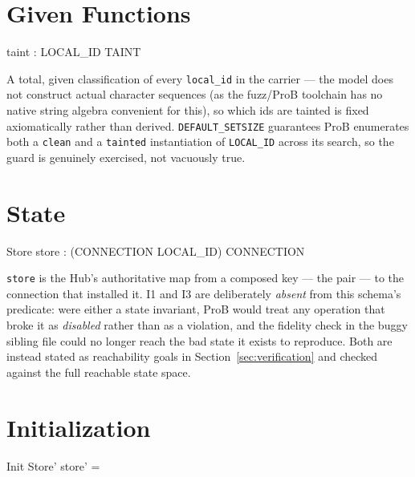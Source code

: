 \documentclass[a4paper,10pt,fleqn]{article}
\begin{document}
\section{Given Functions}

\begin{axdef}
  taint : LOCAL\_ID \fun TAINT
\end{axdef}

A total, given classification of every \texttt{local\_id} in the carrier ---
the model does not construct actual character sequences (as the fuzz/ProB
toolchain has no native string algebra convenient for this), so which ids are
tainted is fixed axiomatically rather than derived. \texttt{DEFAULT\_SETSIZE}
guarantees ProB enumerates both a \texttt{clean} and a \texttt{tainted}
instantiation of \texttt{LOCAL\_ID} across its search, so the guard is
genuinely exercised, not vacuously true.

\section{State}

\begin{schema}{Store}
  store : (CONNECTION \cross LOCAL\_ID) \pfun CONNECTION
\end{schema}

\texttt{store} is the Hub's authoritative map from a composed key --- the pair
--- to the connection that installed it. I1 and I3 are deliberately
\emph{absent} from this schema's predicate: were either a state invariant,
ProB would treat any operation that broke it as \emph{disabled} rather than as
a violation, and the fidelity check in the buggy sibling file could no longer
reach the bad state it exists to reproduce. Both are instead stated as
reachability goals in Section~\ref{sec:verification} and checked against the
full reachable state space.

\section{Initialization}

\begin{schema}{Init}
  Store'
\where
  store' = \emptyset
\end{schema}
\end{document}
